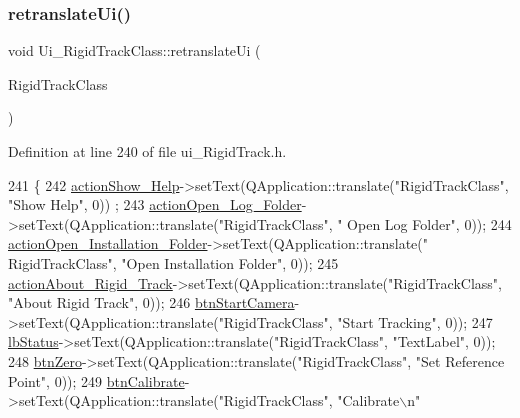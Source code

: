 \subsubsection{\texorpdfstring{retranslate\+Ui()}{retranslateUi()}}
{\footnotesize\ttfamily void Ui\+\_\+\+Rigid\+Track\+Class\+::retranslate\+Ui (\begin{DoxyParamCaption}\item[{Q\+Main\+Window $\ast$}]{Rigid\+Track\+Class }\end{DoxyParamCaption})\hspace{0.3cm}{\ttfamily [inline]}}



Definition at line 240 of file ui\+\_\+\+Rigid\+Track.\+h.


\begin{DoxyCode}
241     \{
242         \hyperlink{class_ui___rigid_track_class_aeb9fefc5e71112c520ae22f6e818d01f}{actionShow\_Help}->setText(QApplication::translate(\textcolor{stringliteral}{"RigidTrackClass"}, \textcolor{stringliteral}{"Show Help"}, 0))
      ;
243         \hyperlink{class_ui___rigid_track_class_a3fb674ec6f96c57d3eef03900b7162ba}{actionOpen\_Log\_Folder}->setText(QApplication::translate(\textcolor{stringliteral}{"RigidTrackClass"}, \textcolor{stringliteral}{"
      Open Log Folder"}, 0));
244         \hyperlink{class_ui___rigid_track_class_adbf50ad17608dbfe8a688dc8f18d1ec3}{actionOpen\_Installation\_Folder}->setText(QApplication::translate(\textcolor{stringliteral}{"
      RigidTrackClass"}, \textcolor{stringliteral}{"Open Installation Folder"}, 0));
245         \hyperlink{class_ui___rigid_track_class_adc074cede51e875e17c38bf23375550a}{actionAbout\_Rigid\_Track}->setText(QApplication::translate(\textcolor{stringliteral}{"RigidTrackClass"}, \textcolor{stringliteral}{
      "About Rigid Track"}, 0));
246         \hyperlink{class_ui___rigid_track_class_a72fc55bdb6021b52b9ec0e97e112d57d}{btnStartCamera}->setText(QApplication::translate(\textcolor{stringliteral}{"RigidTrackClass"}, \textcolor{stringliteral}{"Start Tracking"}, 
      0));
247         \hyperlink{class_ui___rigid_track_class_abeac37c5be33dbe8f2805a9e688b8329}{lbStatus}->setText(QApplication::translate(\textcolor{stringliteral}{"RigidTrackClass"}, \textcolor{stringliteral}{"TextLabel"}, 0));
248         \hyperlink{class_ui___rigid_track_class_acc37707b26574be199e2f33d2f2c31fe}{btnZero}->setText(QApplication::translate(\textcolor{stringliteral}{"RigidTrackClass"}, \textcolor{stringliteral}{"Set Reference Point"}, 0));
249         \hyperlink{class_ui___rigid_track_class_aac22c36a194fd08f919a8e00a78cb1b0}{btnCalibrate}->setText(QApplication::translate(\textcolor{stringliteral}{"RigidTrackClass"}, \textcolor{stringliteral}{"Calibrate\(\backslash\)n"}

\end{DoxyCode}

